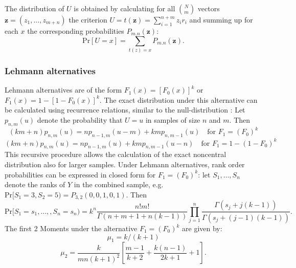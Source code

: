 The distribution of $U$ is obtained by calculating for all $ \binom {N} {m}$ vectors $\textbf{z} = (z_1,\ldots,z_{m+n})$ the criterion $U=t(\textbf{z})=\sum_{i=1}^{n+m} z_i r_i$ and summing up for each $x$ the corresponding probabilities $P_{m.n}(\textbf{z})$:
\begin{equation} 
	\text{Pr}[U = x] = \sum_{t(z)=x} P_{m.n}(\textbf{z}).
\end{equation}


\subsubsection{Lehmann alternatives}
Lehmann alternatives are of the form $F_1(x) = [F_0(x)]^k$ or $F_1(x) = 1-[1-F_0(x)]^k$.
The exact distribution under this alternative can be calculated using recurrence relations, similar to the null-distribution \citep{Shorack_1966}: 
Let $p_{n,m}(u)$ denote the probability that $U=u$ in samples of size $n$ and $m$. Then
\begin{equation} 
	(km+n) p_{n,m}(u) = n p_{n-1,m}(u-m) + km p_{n,m-1}(u) \quad \text{for } F_1 = (F_0)^k 
\end{equation}
\begin{equation}
	(km+n) p_{n,m}(u) = n p_{n-1,m}(u) + km p_{n,m-1}(u-n) \quad \text{for } F_1 = 1-(1-F_0)^k
\end{equation}
This recursive procedure allows the calculation of the exact noncentral distribution also for larger samples.
Under Lehmann alternatives, rank order probabilities can be expressed in closed form for $ F_1 = (F_0)^k$: let $S_1,\ldots,S_n$ denote the ranks of $Y$ in the combined sample, e.g. $\text{Pr}[S_1=3,S_2=5) = P_{3,2}(0,0,1,0,1)$. Then
\begin{equation}
	\text{Pr}[S_1=s_1,\ldots,,S_n=s_n) = k^n \frac{n! m!}{\Gamma(n+m+1+n(k-1))} \prod_{j=1}^n \frac{\Gamma(s_j + j(k-1))}{\Gamma(s_j + (j-1)(k-1))}.
\end{equation}
The first 2 Moments under the alternative $F_1 = (F_0)^k$ are given by:
\begin{equation}
	\mu_1 = k/(k+1)
\end{equation}
\begin{equation}
	\mu_2 = \frac{k}{mn(k+1)^2} \left[ \frac{m-1}{k+2} + \frac{k(n-1)}{2k+1}+1 \right].
\end{equation}


